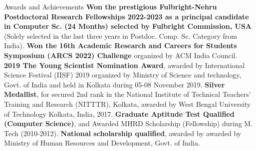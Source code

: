 \begin{rubric}{Awards and Achievements}
\entry*[2022] \textbf{Won the prestigious Fulbright-Nehru Postdoctoral Research Fellowships 2022-2023 as a principal candidate in Computer Sc. (24 Months) selected by Fulbright Commission, USA} (Solely selected in the last three years in Postdoc. Comp. Sc. Category from India).
\entry*[2021] \textbf{Won the 16th Academic Research and Careers for Students Symposium (ARCS 2022) Challenge} organized by ACM India Council.
\entry*[2019] \textbf{2019 The Young Scientist Nomination Award}, awarded by International Science Festival (IISF) 2019 organized by Ministry of Science and technology, Govt. of India and held in Kolkata during 05-08 November 2019.
\entry*[2017] \textbf{Silver Medallist}, for secured 2nd rank in the National Institute of Technical Teachers’ Training and Research (NITTTR), Kolkata, awarded by West Bengal University of Technology Kolkata, India, 2017.
\entry*[2010] \textbf{Graduate Aptitude Test Qualified (Computer Science)}, and Awarded MHRD Scholarship (Fellowship) during M. Tech (2010-2012).
\entry*[2003] \textbf{National scholarship qualified}, awarded by awarded by Ministry of Human Resources and Development, Govt. of India.
\end{rubric}